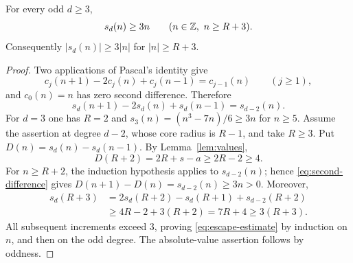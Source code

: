 \begin{lemma}\label{lem:escape-estimate}
For every odd $d\ge3$,
\begin{equation}\label{eq:escape-estimate}
 s_d(n)\ge3n\qquad(n\in\mathbb Z,\ n\ge R+3).
\end{equation}
Consequently $|s_d(n)|\ge3|n|$ for $|n|\ge R+3$.
\end{lemma}
\begin{proof}
Two applications of Pascal's identity give
\[
 c_j(n+1)-2c_j(n)+c_j(n-1)=c_{j-1}(n)\qquad(j\ge1),
\]
and $c_0(n)=n$ has zero second difference. Therefore
\begin{equation}\label{eq:second-difference}
 s_d(n+1)-2s_d(n)+s_d(n-1)=s_{d-2}(n).
\end{equation}
For $d=3$ one has $R=2$ and
$s_3(n)=(n^3-7n)/6\ge3n$ for $n\ge5$.
Assume the assertion at degree $d-2$, whose core radius is $R-1$,
and take $R\ge3$. Put $D(n)=s_d(n)-s_d(n-1)$. By
Lemma~\ref{lem:values},
\[
 D(R+2)=2R+s-a\ge2R-2\ge4.
\]
For $n\ge R+2$, the induction hypothesis applies to
$s_{d-2}(n)$; hence \eqref{eq:second-difference} gives
$D(n+1)-D(n)=s_{d-2}(n)\ge3n>0$. Moreover,
\begin{align*}
 s_d(R+3)
 &=2s_d(R+2)-s_d(R+1)+s_{d-2}(R+2)\\
 &\ge4R-2+3(R+2)=7R+4\ge3(R+3).
\end{align*}
All subsequent increments exceed $3$, proving
\eqref{eq:escape-estimate} by induction on $n$, and then on the odd
degree. The absolute-value assertion follows by oddness.
\end{proof}

